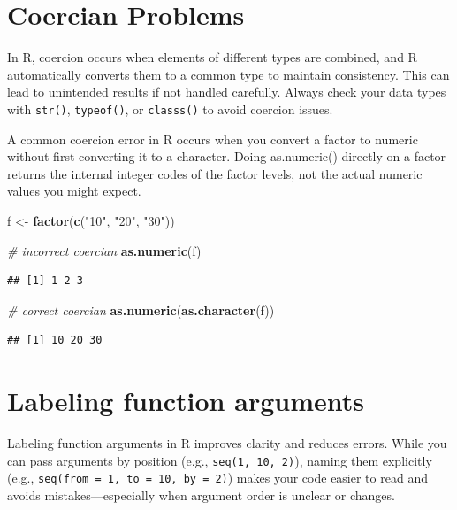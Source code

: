 \documentclass[
]{book}
\newenvironment{Shaded}{\begin{snugshade}}{\end{snugshade}}
\newcommand{\CommentTok}[1]{\textcolor[rgb]{0.56,0.35,0.01}{\textit{#1}}}
\newcommand{\FunctionTok}[1]{\textcolor[rgb]{0.13,0.29,0.53}{\textbf{#1}}}
\newcommand{\NormalTok}[1]{#1}
\newcommand{\OtherTok}[1]{\textcolor[rgb]{0.56,0.35,0.01}{#1}}
\newcommand{\StringTok}[1]{\textcolor[rgb]{0.31,0.60,0.02}{#1}}
\begin{document}
\section{Coercian Problems}\label{coercian-problems}

In R, coercion occurs when elements of different types are combined, and R automatically converts them to a common type to maintain consistency. This can lead to unintended results if not handled carefully. Always check your data types with \texttt{str()}, \texttt{typeof()}, or \texttt{classs()} to avoid coercion issues.

A common coercion error in R occurs when you convert a factor to numeric without first converting it to a character. Doing as.numeric() directly on a factor returns the internal integer codes of the factor levels, not the actual numeric values you might expect.

\begin{Shaded}
\begin{Highlighting}[]
\NormalTok{f }\OtherTok{\textless{}{-}} \FunctionTok{factor}\NormalTok{(}\FunctionTok{c}\NormalTok{(}\StringTok{"10"}\NormalTok{, }\StringTok{"20"}\NormalTok{, }\StringTok{"30"}\NormalTok{))}

\CommentTok{\# incorrect coercian}
\FunctionTok{as.numeric}\NormalTok{(f)}
\end{Highlighting}
\end{Shaded}

\begin{verbatim}
## [1] 1 2 3
\end{verbatim}

\begin{Shaded}
\begin{Highlighting}[]
\CommentTok{\# correct coercian}
\FunctionTok{as.numeric}\NormalTok{(}\FunctionTok{as.character}\NormalTok{(f))}
\end{Highlighting}
\end{Shaded}

\begin{verbatim}
## [1] 10 20 30
\end{verbatim}

\section{Labeling function arguments}\label{labeling-function-arguments}

Labeling function arguments in R improves clarity and reduces errors. While you can pass arguments by position (e.g., \texttt{seq(1,\ 10,\ 2)}), naming them explicitly (e.g., \texttt{seq(from\ =\ 1,\ to\ =\ 10,\ by\ =\ 2)}) makes your code easier to read and avoids mistakes---especially when argument order is unclear or changes.
\end{document}
